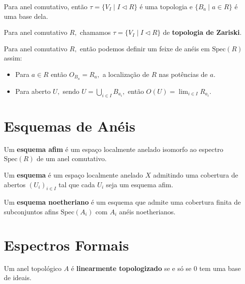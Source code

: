 \documentclass[11pt,twoside,a4paper]{book}
\begin{document}
\begin{proposicao}
Para anel comutativo, então $\tau=\{V_I\mid I\lhd R\}$ é uma topologia e $\{B_a\mid a\in R\}$ é uma base dela.
\end{proposicao}

\begin{definicao}
Para anel comutativo $R,$ chamamos $\tau=\{V_I\mid I\lhd R\}$ de \textbf{topologia de Zariski}.
\end{definicao}

\begin{definicao}
Para anel comutativo $R,$ então podemos definir um feixe de anéis em $\mathrm{Spec}(R)$ assim:
\begin{itemize}
    \item Para $a\in R$ então $O_{B_a}=R_a,$ a localização de $R$ nas potências de $a.$
    \item Para aberto $U,$ sendo $U=\bigcup_{i\in I}B_{a_i},$ então $O(U)=\lim_{i\in I}R_{a_i}.$
\end{itemize}
\end{definicao}

\section{Esquemas de Anéis}

\begin{definicao}
Um \textbf{esquema afim} é um espaço localmente anelado isomorfo ao espectro $\mathrm{Spec}(R)$ de um anel comutativo.
\end{definicao}

\begin{definicao}
Um \textbf{esquema} é um espaço localmente anelado $X$ admitindo uma cobertura de abertos $(U_i)_{i\in I}$ tal que cada $U_i$ seja um esquema afim.
\end{definicao}

\begin{definicao}
Um \textbf{esquema noetheriano} é um esquema que admite uma cobertura finita de subconjuntos afins $\mathrm{Spec}(A_i)$ com $A_i$ anéis noetherianos.
\end{definicao}

\section{Espectros Formais}

\begin{definicao}
Um anel topológico $A$ é \textbf{linearmente topologizado} se e só se $0$ tem uma base de ideais.
\end{definicao}
\end{document}
